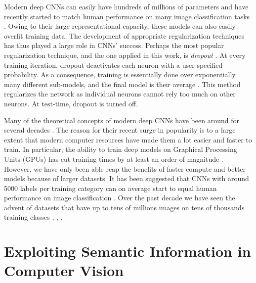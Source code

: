 \documentclass[12pt]{report}
\begin{document}
Modern deep CNNs can easily have hundreds of millions of parameters and have recently started to match human performance on many image classification tasks \cite{Lecun2015}. Owing to their large representational capacity, these models can also easily overfit training data. The development of appropriate regularization techniques has thus played a large role in CNNs' success. Perhaps the most popular regularization technique, and the one applied in this work, is \textit{dropout} \cite{Srivastava2014}. At every training iteration, dropout deactivates each neuron with a user-specified probability. As a consequence, training is essentially done over exponentially many different sub-models, and the final model is their average \cite{Goodfellow2016}. This method regularizes the network as individual neurons cannot rely too much on other neurons. At test-time, dropout is turned off.

Many of the theoretical concepts of modern deep CNNs have been around for several decades \cite{JurgenSchmidhuber2015}. The reason for their recent surge in popularity is to a large extent that modern computer resources have made them a lot easier and faster to train. In particular, the ability to train deep models on Graphical Processing Units (GPUs) has cut training times by at least an order of magnitude \cite{Lecun2015}. However, we have only been able reap the benefits of faster compute and better models because of larger datasets. It has been suggested that CNNs with around 5000 labels per training category can on average start to equal human performance on image classification \cite{Goodfellow2016}. Over the past decade we have seen the advent of datasets that have up to tens of millions images on tens of thousands training classes \cite{Russakovsky2015i}, \cite{JiaDeng2009}, \cite{Netzer2011}.

\section{Exploiting Semantic Information in \\ Computer Vision}
\end{document}
